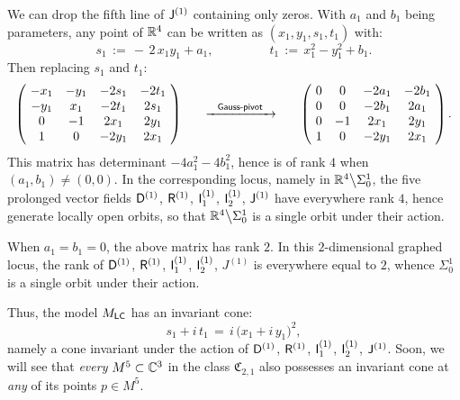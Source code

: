 \documentclass[12pt,twoside,leqno,openany]{amsart}
\begin{document}
\proof
We can drop the fifth line of ${\sf J}^{(1)}$
containing only zeros. With
$a_1$ and $b_1$ being parameters, any point of $\mathbb{R}^4$
can be written as $(x_1, y_1, s_1, t_1)$ with:
\[
s_1
\,:=\,
-\,2\,x_1y_1
+
a_1,
\ \ \ \ \ \ \ \ \ \ \ \ \ \ \ \ \ \ \ \
t_1
\,:=\,
x_1^2-y_1^2
+
b_1.
\]
Then replacing $s_1$ and $t_1$:
\[
\left(\!
\begin{array}{cccc}
-x_1 & -y_1 & -2s_1 & -2t_1
\\
-y_1 & x_1 & -2t_1 & 2s_1
\\
0 & -1 & 2x_1 & 2y_1
\\
1 & 0 & -2y_1 & 2x_1
\end{array}
\!\right)
\ \ \ \ \
\xrightarrow[{\rule[0pt]{50pt}{0pt}}]{\text{\sf Gauss-pivot}}
\ \ \ \ \
\left(\!
\begin{array}{cccc}
0 & 0 & -2a_1 & -2b_1
\\
0 & 0 & -2b_1 & 2a_1
\\
0 & -1 & 2x_1 & 2y_1
\\
1 & 0 & -2y_1 & 2x_1
\end{array}
\!\right).
\]
This matrix has determinant $-4a_1^2 - 4b_1^2$, hence is of
rank $4$ when $(a_1, b_1) \neq (0, 0)$. In the
corresponding locus, namely in $\mathbb{R}^4 \big\backslash \Sigma_0^1$,
the five prolonged vector fields
${\sf D}^{(1)}$, ${\sf R}^{(1)}$, ${\sf I}_1^{(1)}$,
${\sf I}_2^{(1)}$, ${\sf J}^{(1)}$ have everywhere rank $4$, 
hence generate locally open orbits, so that 
$\mathbb{R}^4 \big\backslash \Sigma_0^1$ is a single 
orbit under their action.
 
When $a_1 = b_1 = 0$, the above matrix has rank $2$. 
In this $2$-dimensional graphed locus, the rank of
${\sf D}^{(1)}$, ${\sf R}^{(1)}$, ${\sf I}_1^{(1)}$,
${\sf I}_2^{(1)}$, $J^{(1)}$ is everywhere equal to $2$,
whence $\Sigma_0^1$ is a single orbit under their action.
\endproof

Thus, the model $M_{\sf LC}$ has an invariant cone:
\[
s_1
+
i\,t_1
\,=\,
i\,
\big(
x_1
+
i\,y_1
\big)^2,
\]
namely a cone invariant under the action of
${\sf D}^{(1)}$, ${\sf R}^{(1)}$, ${\sf I}_1^{(1)}$,
${\sf I}_2^{(1)}$, ${\sf J}^{(1)}$.
Soon, we will see that {\em every} $M^5 \subset \mathbb{C}^3$ in the class
$\mathfrak{C}_{2,1}$ also possesses an invariant cone
at {\em any} of its points $p \in M^5$.

\label{prolongations-jet-2}
\end{document}
